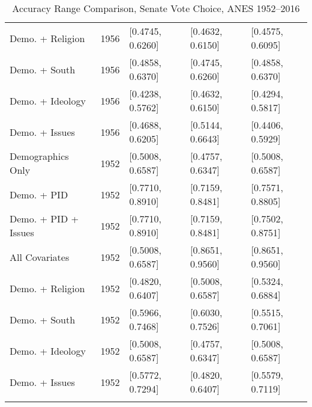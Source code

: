\begin{longtable}{lrlll}
  Demo. + Religion & 1956 & [0.4745, 0.6260] & [0.4632, 0.6150] & [0.4575, 0.6095] \\ 
  Demo. + South & 1956 & [0.4858, 0.6370] & [0.4745, 0.6260] & [0.4858, 0.6370] \\ 
  Demo. + Ideology & 1956 & [0.4238, 0.5762] & [0.4632, 0.6150] & [0.4294, 0.5817] \\ 
  Demo. + Issues & 1956 & [0.4688, 0.6205] & [0.5144, 0.6643] & [0.4406, 0.5929] \\ 
  Demographics Only & 1952 & [0.5008, 0.6587] & [0.4757, 0.6347] & [0.5008, 0.6587] \\ 
  Demo. + PID & 1952 & [0.7710, 0.8910] & [0.7159, 0.8481] & [0.7571, 0.8805] \\ 
  Demo. + PID + Issues & 1952 & [0.7710, 0.8910] & [0.7159, 0.8481] & [0.7502, 0.8751] \\ 
  All Covariates & 1952 & [0.5008, 0.6587] & [0.8651, 0.9560] & [0.8651, 0.9560] \\ 
  Demo. + Religion & 1952 & [0.4820, 0.6407] & [0.5008, 0.6587] & [0.5324, 0.6884] \\ 
  Demo. + South & 1952 & [0.5966, 0.7468] & [0.6030, 0.7526] & [0.5515, 0.7061] \\ 
  Demo. + Ideology & 1952 & [0.5008, 0.6587] & [0.4757, 0.6347] & [0.5008, 0.6587] \\ 
  Demo. + Issues & 1952 & [0.5772, 0.7294] & [0.4820, 0.6407] & [0.5579, 0.7119] \\ 
   \bottomrule
\caption{Accuracy Range Comparison, Senate Vote Choice, ANES 1952--2016} 
\label{tab:ANES_senate_accuracy}
\end{longtable}
